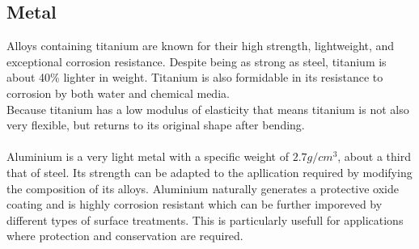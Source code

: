 \documentclass[11pt, a4paper]{article}
\begin{document}
\subsection{Metal}
Alloys containing titanium are known for their high strength, lightweight, and exceptional corrosion resistance.
Despite being as strong as steel, titanium is about 40\% lighter in weight.
Titanium is also formidable in its resistance to corrosion by both water and chemical media.
\\
Because titanium has a low modulus of elasticity that means titanium is not also very flexible, but returns to its original shape after bending.
\\ \\
Aluminium is a very light metal with a specific weight of $2.7 g/cm^3$, about a third that of steel.
Its strength can be adapted to the apllication required by modifying the composition of its alloys.
Aluminium naturally generates a protective oxide coating and is highly corrosion resistant which can be further imporeved by different types of surface treatments. 
This is particularly usefull for applications where protection and conservation are required.
\end{document}
